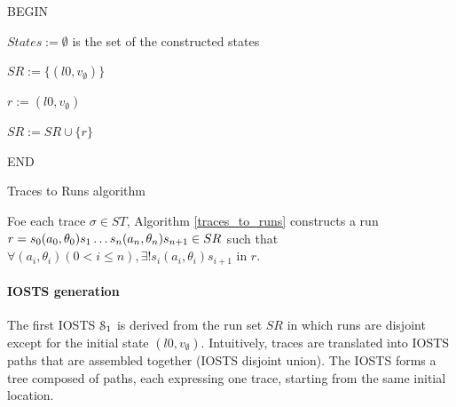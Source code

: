 \begin{algorithm}
 


BEGIN\;

$States:=\emptyset$ is the set of the constructed states\;

 {
$SR:= \{(l0,v_\emptyset)\}$}

 {
$r:= (l0,v_\emptyset)$\;


$SR:=SR \cup \{r\}$

}%

END\;

    \caption{Traces to Runs algorithm}
    \label{traces_to_runs}
\end{algorithm}


\begin{proposition}
Foe each trace $\sigma \in ST$, Algorithm \ref{traces_to_runs}
constructs a run $r=s_0(a_0,\theta_0)s_1 \dots\\s_n(a_n,\theta_n)s_{n+1} \in SR$ such that $\forall (a_i,\theta_i)
( 0<i\leq n), \exists ! s_i(a_i,\theta_i)s_{i+1}$ in $r$.
\end{proposition}

\paragraph{IOSTS generation}
\label{sec:iosts-gen}

The first IOSTS $\EuScript{S}_1$ is derived from the run set $SR$
in which runs are disjoint except for the initial state
$(l0,v_\emptyset)$. Intuitively, traces are translated into IOSTS
paths that are assembled together (IOSTS disjoint union). The
IOSTS forms a tree composed of paths, each expressing one trace,
starting from the same initial location.

